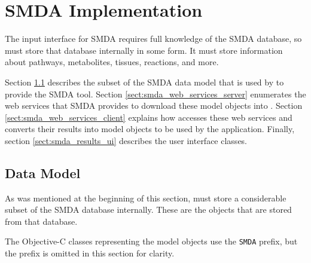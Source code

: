 \section{SMDA Implementation}
\label{sect:smda_implementation}

The input interface for SMDA requires full knowledge of the SMDA database, so
\mawapp must store that database internally in some form.  It must store
information about pathways, metabolites, tissues, reactions, and more.

Section \ref{sect:smda_data_model} describes the subset of the SMDA data
model that is used by \mawapp to provide the SMDA tool. Section
\ref{sect:smda_web_services_server} enumerates the web services that
SMDA provides to download these model objects into \mawapp. Section
\ref{sect:smda_web_services_client} explains how \mawapp accesses these web
services and converts their results into model objects to be used by the
application. Finally, section \ref{sect:smda_results_ui} describes the user
interface classes.

\subsection{Data Model}
\label{sect:smda_data_model}

As was mentioned at the beginning of this section, \mawapp must store a
considerable subset of the SMDA database internally. These are the objects that
are stored from that database.

The Objective-C classes representing the model objects use the \texttt{SMDA}
prefix, but the prefix is omitted in this section for clarity.

